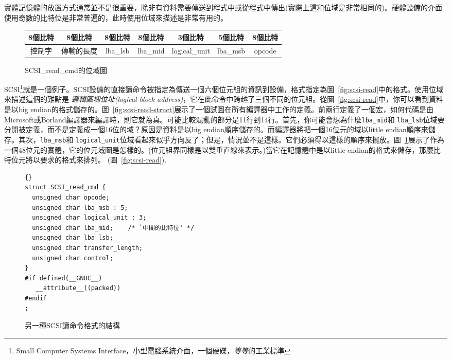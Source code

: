 實體記憶體的放置方式通常並不是很重要，除非有資料需要傳送到程式中或從程式中傳出(實際上這和位域是非常相同的)。硬體設備的介面使用奇數的比特位是非常普遍的，此時使用位域來描述是非常有用的。

\begin{figure}[t]
\centering
\begin{tabular}{|c||c||c||c||c|c||c|}
\multicolumn{1}{c}{8個比特} & \multicolumn{1}{c}{8個比特} &
\multicolumn{1}{c}{8個比特} & \multicolumn{1}{c}{8個比特} &
\multicolumn{1}{c}{3個比特} & \multicolumn{1}{c}{5個比特} &
\multicolumn{1}{c}{8個比特} \\ \hline 控制字 & 傳輸的長度 & lba\_lsb
& lba\_mid &
logical\_unit  & lba\_msb & opcode \\
\hline
\end{tabular}
\caption{{\code SCSI\_read\_cmd}的位域圖 \label{fig:scsi-read-map}}
\end{figure}
SCSI\footnote{Small Computer Systems Interface，小型電腦系統介面，一個硬碟，\emph{等等}的工業標準}就是一個例子。SCSI設備的直接讀命令被指定為傳送一個六個位元組的資訊到設備，格式指定為圖~\ref{fig:scsi-read}中的格式。使用位域來描述這個的難點是
\emph{邏輯區塊位址(logical block address)}，它在此命令中跨越了三個不同的位元組。從圖~\ref{fig:scsi-read}中，你可以看到資料是以big endian的格式儲存的。圖~\ref{fig:scsi-read-struct}展示了一個試圖在所有編譯器中工作的定義。前兩行定義了一個宏，如何代碼是由Microsoft或Borland編譯器來編譯時，則它就為真。可能比較混亂的部分是11行到14行。首先，你可能會想為什麼\lstinline|lba_mid|和
\lstinline|lba_lsb|位域要分開被定義，而不是定義成一個16位的域？原因是資料是以big endian順序儲存的。而編譯器將把一個16位元的域以little endian順序來儲存。其次，\lstinline|lba_msb|和 \lstinline|logical_unit|位域看起來似乎方向反了；但是，情況並不是這樣。它們必須得以這樣的順序來擺放。圖~\ref{fig:scsi-read-map}展示了作為一個48位元的實體，它的位元域圖是怎樣的。(位元組界同樣是以雙垂直線來表示。)當它在記憶體中是以little endian的格式來儲存，那麼比特位元將以要求的格式來排列。
(圖~\ref{fig:scsi-read}).

\begin{figure}[t]
\lstset{escapeinside=`',language=Pascal,%
}
\begin{lstlisting}[frame=lrtb]{}
struct SCSI_read_cmd {
  unsigned char opcode;
  unsigned char lba_msb : 5;
  unsigned char logical_unit : 3;
  unsigned char lba_mid;    /* `中間的比特位' */
  unsigned char lba_lsb;
  unsigned char transfer_length;
  unsigned char control;
}
#if defined(__GNUC__)
   __attribute__((packed))
#endif
;
\end{lstlisting}
\caption{另一種SCSI讀命令格式的結構\label{fig:scsi-read-struct2}
         }
\end{figure}

